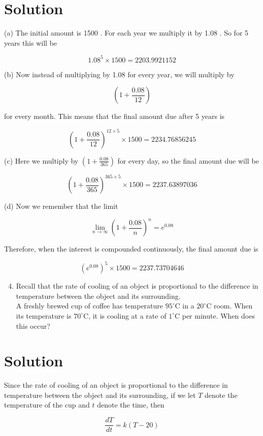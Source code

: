 \documentclass[10pt]{article}
\begin{document}
\section*{Solution}
(a) The initial amount is 1500 . For each year we multiply it by 1.08 . So for 5 years this will be

$$
1.08^{5} \times 1500=2203.9921152
$$

(b) Now instead of multiplying by 1.08 for every year, we will multiply by

$$
\left(1+\frac{0.08}{12}\right)
$$

for every month. This means that the final amount due after 5 years is

$$
\left(1+\frac{0.08}{12}\right)^{12 \times 5} \times 1500=2234.76856245
$$

(c) Here we multiply by $\left(1+\frac{0.08}{365}\right)$ for every day, so the final amount due will be

$$
\left(1+\frac{0.08}{365}\right)^{365 \times 5} \times 1500=2237.63897036
$$

(d) Now we remember that the limit

$$
\lim _{n \rightarrow \infty}\left(1+\frac{0.08}{n}\right)^{n}=e^{0.08}
$$

Therefore, when the interest is compounded continuously, the final amount due is

$$
\left(e^{0.08}\right)^{5} \times 1500=2237.73704646
$$

\begin{enumerate}
  \setcounter{enumi}{3}
  \item Recall that the rate of cooling of an object is proportional to the difference in temperature between the object and its surrounding.\\
A freshly brewed cup of coffee has temperature $95^{\circ} \mathrm{C}$ in a $20^{\circ} \mathrm{C}$ room. When its temperature is $70^{\circ} \mathrm{C}$, it is cooling at a rate of $1^{\circ} \mathrm{C}$ per minute. When does this occur?
\end{enumerate}

\section*{Solution}
Since the rate of cooling of an object is proportional to the difference in temperature between the object and its surrounding, if we let $T$ denote the temperature of the cup and $t$ denote the time, then

$$
\frac{d T}{d t}=k(T-20)
$$
\end{document}
